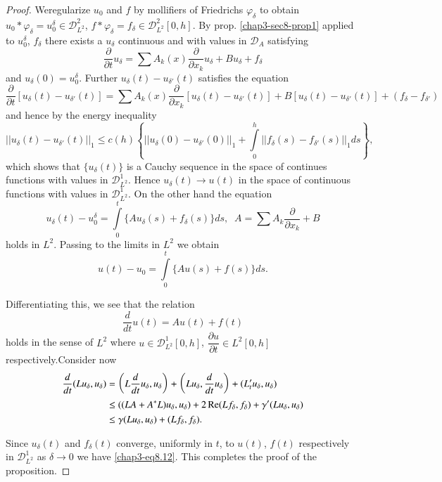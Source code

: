 \begin{proof}
We\pageoriginale regularize $u_0$ and $f$ by mollifiers of Friedrichs
$\varphi_{\delta}$ to obtain $u_0 * \varphi_{\delta} = u^{\delta}_0
\in \mathscr{D}^2_{L^{2}}$, $f * \varphi_\delta = f_\delta \in
\mathscr{D}^2_{L^2} [0, h]$. By prop. \ref{chap3-sec8-prop1} 
applied to $u^{\delta}_0$, $f_{\delta}$ there exists a $u_{\delta}$
continuous and with values in $\mathscr{D}_A$ satisfying  
\begin{equation*}
\frac{\partial}{\partial t} u_{\delta} = \sum A_k (x)
\frac{\partial}{\partial x_k} u_{\delta} + Bu_{\delta} + f_{\delta}
\tag{8.12} \label{chap3-eq8.12}
\end{equation*}
and $u_{\delta} (0) = u^{\delta}_0$. Further $u_{\delta} (t) -
u_{\delta'} (t)$ satisfies the equation 
{\fontsize{10pt}{12pt}\selectfont
$$
\frac{\partial}{\partial t} \left[u_{\delta} (t)-u_{\delta'} (t)
  \right] = \sum A_k (x) \frac{\partial}{\partial x_k} \left[u_{\delta} (t)
  - u_{\delta'} (t) \right] + B[u_{\delta} (t) - u_{\delta'} (t)] +
(f_{\delta} - f_{\delta'})  
$$}\relax
and hence by the energy inequality
\begin{equation*}
|| u_{\delta} (t) - u_{\delta'} (t) ||_1 \leq c(h) \left\{ || u_{\delta}
(0) - u_{\delta'} (0) ||_1 + \int\limits^h_0 ||f_{\delta} (s) -
f_{\delta'} (s) ||_1 ds\right\}, \tag{8.13} \label{chap3-eq8.13}
\end{equation*}
which shows that $\{u_{\delta} (t) \} $ is a Cauchy sequence in the
space of continues functions with values in
$\mathscr{D}^1_{L^2}$. Hence $u_{\delta} (t) \to u(t)$ in the space of
continuous functions with values in $\mathscr{D}^1_{L^2}$. On the
other hand the equation 
$$
u_{\delta} (t) - u^{\delta}_0 = \int\limits^t_0 \{ A u_{\delta} (s) +
f_{\delta} (s) \} ds, \;\; A = \sum A_k \frac{\partial}{\partial x_k} + B 
$$
holds in $L^2$. Passing to the limits in $L^2$ we obtain  
$$
u(t) - u_0 = \int\limits^t_0 \{ Au(s) + f(s) \} ds. 
$$

Differentiating this, we see that the relation  
$$
\frac{d}{dt} u (t) = Au(t) + f(t) 
$$
holds in the sense of $L^2$ where $u \in \mathscr{D}^1_{L^2}
[0, h]$, $\dfrac{\partial u}{\partial t} \in L^2 [0, h]$
respectively.\pageoriginale Consider now 
\begin{align*}
\frac{d}{dt} (Lu_{\delta}, u_{\delta}) & = \left(L \frac{d}{dt} u_{\delta},
u_{\delta}\right) + \left( L u_{\delta},\frac{d}{dt}  u_{\delta}\right) + (L_t'
u_{\delta}, u_{\delta})\\ 
& \leq ((LA+ A^*L) u_{\delta}, u_{\delta}) + 2 \operatorname{Re} (Lf_{\delta},
f_{\delta}) + \gamma' (L u_{\delta}, u_{\delta})\\ 
& \leq \gamma (L u_{\delta}, u_{\delta}) + (L f_{\delta}, f_{\delta}).
\end{align*}

Since $u_{\delta} (t)$ and $f_{\delta} (t)$ converge, uniformly in
$t$, to $u(t)$, $f(t)$ respectively in $\mathscr{D}^1_{L^2}$ as $\delta
\to 0$ we have \eqref{chap3-eq8.12}. This completes the proof of the
proposition.  
\end{proof}

